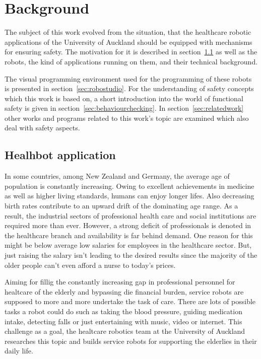 \chapter{Background}
\label{chap:background}

The subject of this work evolved from the situation, that the healthcare robotic applications of the University of Auckland should be equipped with mechanisms for ensuring safety.
The motivation for it is described in section~\ref{sec:healthbotapplication} as well as the robots, the kind of applications running on them, and their technical background.

The visual programming environment used for the programming of these robots is presented in section~\ref{sec:robostudio}.
For the understanding of safety concepts which this work is based on, a short introduction into the world of functional safety is given in section~\ref{sec:behaviourchecking}. In section~\ref{sec:relatedwork} other works and programs related to this work's topic are examined which also deal with safety aspects.




\section{Healhbot application}
\label{sec:healthbotapplication}

In some countries, among New Zealand and Germany, the average age of population is constantly increasing. Owing to excellent achievements in medicine as well as higher living standards, humans can enjoy longer lifes. Also decreasing birth rates contribute to an upward drift of the dominating age range. As a result, the industrial sectors of professional health care and social institutions are required more than ever.
However, a strong deficit of professionals is denoted in the healthcare branch and availability is far behind demand. One reason for this might be below average low salaries for employees in the healthcare sector. But, just raising the salary isn't leading to the desired results since the majority of the older people can't even afford a nurse to today's prices.

Aiming for fillig the constantly increasing gap in professional personnel for healtcare of the elderly and bypassing die financial burden, service robots are supposed to more and more undertake the task of care.
There are lots of possible tasks a robot could do such as taking the blood pressure, guiding medication intake, detecting falls or just entertaining with music, video or internet.
This challenge as a goal, the healtcare robotics team at the University of Auckland researches this topic and builds service robots for supporting the elderlies in their daily life.


